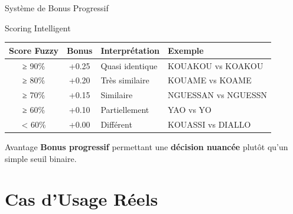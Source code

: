 \documentclass[aspectratio=169]{beamer}
\begin{document}
\begin{frame}{Système de Bonus Progressif}
    \begin{block}{Scoring Intelligent}
        \begin{table}
            \begin{tabular}{ccll}
                \toprule
                \textbf{Score Fuzzy} & \textbf{Bonus} & \textbf{Interprétation} & \textbf{Exemple} \\
                \midrule
                ≥ 90\% & +0.25 & Quasi identique & KOUAKOU vs KOAKOU \\
                ≥ 80\% & +0.20 & Très similaire & KOUAME vs KOAME \\
                ≥ 70\% & +0.15 & Similaire & NGUESSAN vs NGUESSN \\
                ≥ 60\% & +0.10 & Partiellement & YAO vs YO \\
                < 60\% & +0.00 & Différent & KOUASSI vs DIALLO \\
                \bottomrule
            \end{tabular}
        \end{table}
    \end{block}

    \vspace{0.3cm}

    \begin{exampleblock}{Avantage}
        \textbf{Bonus progressif} permettant une \textbf{décision nuancée} plutôt qu'un simple seuil binaire.
    \end{exampleblock}
\end{frame}

\section{Cas d'Usage Réels}
\end{document}
